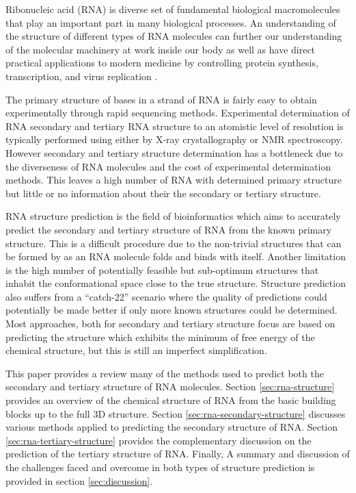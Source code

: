 \documentclass[journal]{IEEEtran}
\begin{document}
Ribonucleic acid (RNA) is diverse set of fundamental biological macromolecules that play an important part in many biological processes. An understanding of the structure of different types of RNA molecules can further our understanding of the molecular machinery at work inside our body as well as have direct practical applications to modern medicine by controlling protein synthesis, transcription, and virus replication \cite{schlick2010molecular}.

The primary structure of bases in a strand of RNA is fairly easy to obtain experimentally through rapid sequencing methods. Experimental determination of RNA secondary and tertiary RNA structure to an atomistic level of resolution is typically performed using either by X-ray crystallography or NMR spectroscopy. However secondary and tertiary structure determination has a bottleneck due to the diverseness of RNA molecules and the cost of experimental determination methods\cite{ya2014rna}. This leaves a high number of RNA with determined primary structure but little or no information about their the secondary or tertiary structure.

RNA structure prediction is the field of bioinformatics which aims to accurately predict the secondary and tertiary structure of RNA from the known primary structure. This is a difficult procedure due to the non-trivial structures that can be formed by as an RNA molecule folds and binds with itself. Another limitation is the high number of potentially feasible but sub-optimum structures that inhabit the conformational space close to the true structure. Structure prediction also suffers from a ``catch-22'' scenario where the quality of predictions could potentially be made better if only more known structures could be determined. Most approaches, both for secondary and tertiary structure focus are based on predicting the structure which exhibits the minimum of free energy of the chemical structure, but this is still an imperfect simplification.

This paper provides a review many of the methods used to predict both the secondary and tertiary structure of RNA molecules. Section \ref{sec:rna-structure} provides an overview of the chemical structure of RNA from the basic building blocks up to the full 3D structure. Section \ref{sec:rna-secondary-structure} discusses various methods applied to predicting the secondary structure of RNA. Section \ref{sec:rna-tertiary-structure} provides the complementary discussion on the prediction of the tertiary structure of RNA. Finally, A summary and discussion of the challenges faced and overcome in both types of structure prediction is provided in section \ref{sec:discussion}.
\end{document}
